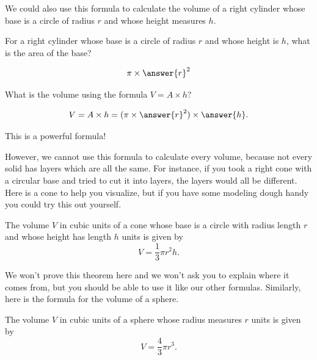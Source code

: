 \documentclass{ximera}
\begin{document}
We could also use this formula to calculate the volume of a right cylinder whose base is a circle of radius $r$ and whose height measures $h$. 
\begin{question}
For a right cylinder whose base is a circle of radius $r$ and whose height is $h$, what is the area of the base?
\begin{prompt}
\[
\pi \times \answer{r}^2
\]
\end{prompt}

What is the volume using the formula $V = A \times h$?
\begin{prompt}
\[
V = A \times h = (\pi \times \answer{r}^2 ) \times \answer{h}.
\]
\end{prompt}
\end{question}
This is a powerful formula!

However, we cannot use this formula to calculate every volume, because not every solid has layers which are all the same. For instance, if you took a right cone with a circular base and tried to cut it into layers, the layers would all be different. Here is a cone to help you visualize, but if you have some modeling dough handy you could try this out yourself.
\begin{image}
\end{image}
\begin{theorem}
The volume $V$ in cubic units of a cone whose base is a circle with radius length $r$ and whose height has length $h$ units is given by
\[
V = \frac13 \pi r^2 h.
\]
\end{theorem}
We won't prove this theorem here and we won't ask you to explain where it comes from, but you should be able to use it like our other formulas. Similarly, here is the formula for the volume of a sphere.
\begin{theorem}
The volume $V$ in cubic units of a sphere whose radius measures $r$ units is given by
\[
V = \frac43 \pi r^3.
\]
\end{theorem}
\end{document}
